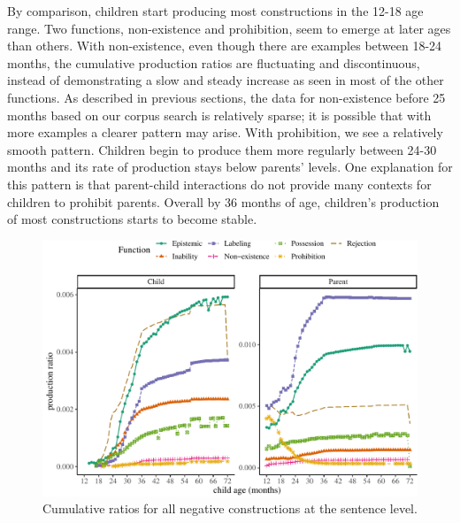 \documentclass[
  english,
  man,floatsintext]{apa6}
\begin{document}
By comparison, children start producing most constructions in the 12-18 age range. Two functions, non-existence and prohibition, seem to emerge at later ages than others. With non-existence, even though there are examples between 18-24 months, the cumulative production ratios are fluctuating and discontinuous, instead of demonstrating a slow and steady increase as seen in most of the other functions. As described in previous sections, the data for non-existence before 25 months based on our corpus search is relatively sparse; it is possible that with more examples a clearer pattern may arise. With prohibition, we see a relatively smooth pattern. Children begin to produce them more regularly between 24-30 months and its rate of production stays below parents' levels. One explanation for this pattern is that parent-child interactions do not provide many contexts for children to prohibit parents. Overall by 36 months of age, children's production of most constructions starts to become stable.

\begin{figure}[H]

{\centering \includegraphics{neg_construction_article_files/figure-latex/allneg-1} 

}

\caption{Cumulative ratios for all negative constructions at the sentence level.}\label{fig:allneg}
\end{figure}
\end{document}

